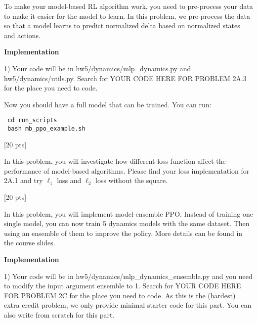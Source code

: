 \documentclass{article}
\begin{document}
 \vskip 0.5in
To make your model-based RL algorithm work, you need to pre-process your data to make it easier for the model to learn. In this problem, we pre-process the data so that a model learns to predict normalized delta based on normalized states and actions.   

{\bf Implementation} 
 
 1) Your code will be in hw5/dynamics/mlp\_dynamics.py and hw5/dynamics/utils.py. Search for YOUR CODE HERE FOR PROBLEM 2A.3 for the place you need to code.
 
 Now you should have a full model that can be trained. You can run:
 \begin{verbatim}
 cd run_scripts
 bash mb_ppo_example.sh
 \end{verbatim}
 
 
 \vskip 0.5in
  [20 pts]
 
 In this problem, you will investigate how different loss function affect the performance of model-based algorithms. Please find your loss implementation for 2A.1 and try $\ell_1$ loss and $\ell_2$ loss without the square.
 
 
 \vskip 0.5in 
[20 pts] 

In this problem, you will implement model-ensemble PPO. Instead of training one single model, you can now train 5 dynamics models with the same dataset. Then using an ensemble of them to improve the policy. More details can be found in the course slides. 

{\bf Implementation} 
 
 1) Your code will be in hw5/dynamics/mlp\_dynamics\_ensemble.py and you need to modify the input argument ensemble to 1. Search for YOUR CODE HERE FOR PROBLEM 2C for the place you need to code. As this is the (hardest) extra credit problem, we only provide minimal starter code for this part. You can also write from scratch for this part.
 
 \vskip 0.5in
 
\end{document}
